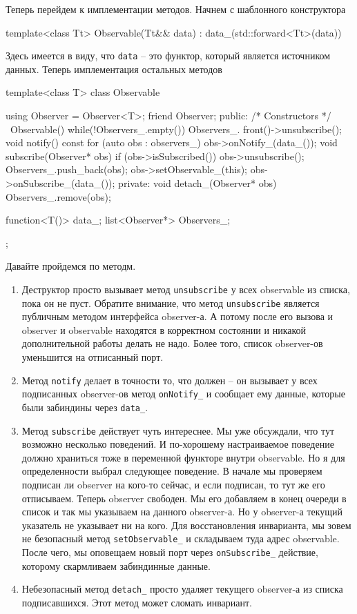 Теперь перейдем к имплементации методов.
Начнем с шаблонного конструктора
\begin{cppcode}
template<class Tt>
Observable(Tt&& data) : data_(std::forward<Tt>(data))
\end{cppcode}
Здесь имеется в виду, что \verb"data" -- это функтор, который является источником данных.
Теперь имплементация остальных методов
\begin{cppcode}
template<class T>
class Observable {
  using Observer = Observer<T>;
  friend Observer;
public:
	/* Constructors */
  ~Observable() {
    while(!Observers_.empty()) {
      Observers_.
        front()->unsubscribe();
    }
  }
  void notify() const {
    for (auto obs : observers_)
      obs->onNotify_(data_());
  }
  void subscribe(Observer* obs) {
    if (obs->isSubscribed())
      obs->unsubscribe();
    Observers_.push_back(obs);
    obs->setObservable_(this);
    obs->onSubscribe_(data_());
  }
private:
  void detach_(Observer* obs) {
    Observers_.remove(obs);
  }
  
  function<T()> data_;
  list<Observer*> Observers_;
};
\end{cppcode}
Давайте пройдемся по методм.
\begin{enumerate}
\item Деструктор просто вызывает метод \verb"unsubscribe" у всех observable из списка, пока он не пуст.
Обратите внимание, что метод \verb"unsubscribe" является публичным методом интерфейса observer-а.
А потому после его вызова и observer и observable находятся в корректном состоянии и никакой дополнительной работы делать не надо.
Более того, список observer-ов уменьшится на отписанный порт.

\item Метод \verb"notify" делает в точности то, что должен -- он вызывает у всех подписанных observer-ов метод \verb"onNotify_" и сообщает ему данные, которые были забиндины через \verb"data_".

\item Метод \verb"subscribe" действует чуть интереснее.
Мы уже обсуждали, что тут возможно несколько поведений.
И по-хорошему настраиваемое поведение должно храниться тоже в переменной функторе внутри observable.
Но я для определенности выбрал следующее поведение.
В начале мы проверяем подписан ли observer на кого-то сейчас, и если подписан, то тут же его отписываем.
Теперь observer свободен.
Мы его добавляем в конец очереди в список и так мы указываем на данного observer-а.
Но у observer-а текущий указатель не указывает ни на кого.
Для восстановления инварианта, мы зовем не безопасный метод \verb"setObservable_" и складываем туда адрес observable.
После чего, мы оповещаем новый порт через \verb"onSubscribe_" действие, которому скармливаем забиндинные данные.

\item Небезопасный метод \verb"detach_" просто удаляет текущего observer-а из списка подписавшихся.
Этот метод может сломать инвариант.
\end{enumerate}

